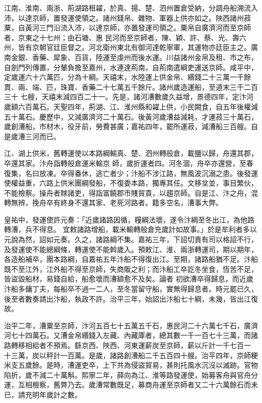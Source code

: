 \begin{pinyinscope}
 江南、淮南、兩浙、荊湖路租糴，於真、揚、楚、泗州置倉受納，分調舟船溯流入沛，以達京師，置發運使領之。諸州錢帛、雜物、軍器上供亦如之。陜西諸州菽粟，自黃河三門沿流入沛，以達京師，亦置發運司領之。粟帛自廣濟河而至京師者，京東之十七州；由石塘、惠
 民河而至京師者，陳、穎、許、蔡、光、壽六州，皆有京朝官廷臣督之。河北衛州東北有御河達乾寧軍，其運物亦廷臣主之。廣南金銀、香藥、犀象、百貨，陸運至虔州而後水運。川益諸州金帛及租、市之布，自劍門列傳置，分輦負擔至嘉州，水連達荊南，自荊南遣綱吏運送京師。咸平中，定歲運六十六萬匹，分為十綱。天禧末，水陸運上供金帛、緡錢二十三萬一千餘貫、兩、端、匹，珠寶、香藥二十七萬五千餘斤。諸州歲造運船，至道末三千二百三十
 七艘，天禧末減四百二十一。先是，諸河漕數歲久益增，景德四年，定汴河歲額六百萬石。天聖四年，荊湖、江、淮州縣和糴上供，小民闕食，自五年後權減五十萬石。慶歷中，又減廣濟河二十萬石。後黃河歲漕益減耗，才運菽三十萬石，歲創漕船，市材木，役牙前，勞費甚廣；嘉祐四年，罷所運菽，減漕船三百艘。自是歲漕三河而已。



 江、湖上供米，舊轉運使以本路綱輸真、楚、泗州轉般倉，載鹽以歸，舟還其郡，卒還其家。汴舟詣轉般倉運米輸京
 師，歲折運者四。河冬涸，舟卒亦還營，至春復集，名曰放凍。卒得番休，逃亡者少；汴船不涉江路，無風波沉溺之患。後發運使權益重，六路上供米團綱發船，不復委本路，獨專其任。文移坌並，事目繁伙，不能檢察。操舟者賕諸吏，得詣富饒郡市賤貿貴，以趨京師。自是江、汴之舟，混轉無辨，挽舟卒有終身不還其家、老死河路者。籍多空名，漕事大弊。



 皇祐中，發運使許元奏：「近歲諸路因循，糧綱法壞，遂令汴綱至冬出江，為他路轉漕，兵不得息。
 宜敕諸路增船，載米輸轉般倉充歲計如故事。」於是牟利者多以元說為然，詔如元奏。久之，諸路綱不集。嘉祐三年，下詔切責有司以格詔不行，及發運使不能總綱條，轉運使不能斡歲入。預敕江、淮、兩浙轉運司，期以期年，各造船補卒，團本路綱，自嘉祐五年汴船不得復出江。至期，諸路船猶不足。汴船既不至江外，江外船不得至京師，失商販之利；而汴船工卒訖冬坐食，恆苦不足，皆盜毀船材，易錢自給，船愈壞而漕額愈不及矣。論者
 初欲漕卒得歸息，而近歲汴船多傭丁夫，每船卒不過一二人，至冬當留守船，實無得歸息者。時元罷已久，後至者數奏請出汴船，執政不許。治平三年，始詔出汴船七十綱，未幾，皆出江復故。



 治平二年，漕粟至京師，汴河五百七十五萬五千石，惠民河二十六萬七千石，廣濟河七十四萬石。又漕金帛緡錢入左藏、內藏庫者，總其數一千一百七十三萬，而諸路轉移相給者不預焉。繇京西、陜西、河東運薪炭至京師，薪以斤計一千七百一
 十三萬，炭以秤計一百萬。是歲，諸路創漕船二千五百四十艘。治平四年，京師粳米支五歲餘。是時，漕運吏卒，上下共為侵盜貿易，甚則托風水沉沒以滅跡。官物陷折，歲不減二十萬斛。熙寧二年，薛向為江、淮等路發運使，始募客舟與官舟分運，互相檢察，舊弊乃去。歲漕常數既足，募商舟運至京師者又二十六萬餘石而未已，請充明年歲計之數。




\end{pinyinscope}
